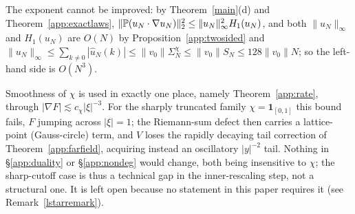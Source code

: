 \begin{remark}\label{app:sharpness}
The exponent cannot be improved: by Theorem~\ref{main}(d) and
Theorem~\ref{app:exactlaws},
$\|\mathbb P(u_N\cdot\nabla u_N)\|_2^2\le\|u_N\|_\infty^2H_1(u_N)$, and both
$\|u_N\|_\infty$ and $H_1(u_N)$ are $O(N)$ by
Proposition~\ref{app:twosided} and
$\|u_N\|_\infty\le\sum_{k\neq0}|\hat u_N(k)|\le\|v_0\|\Sigma_N^\chi
\le\|v_0\|S_N\le128\|v_0\|N$; so the left-hand side is $O(N^3)$.

Smoothness of $\chi$ is used in exactly one place, namely
Theorem~\ref{app:rate}, through $|\nabla F|\lesssim c_\chi|\xi|^{-3}$.
For the sharply truncated family $\chi=\mathbf 1_{[0,1]}$ this bound
fails, $F$ jumping across $|\xi|=1$; the Riemann-sum defect then carries
a lattice-point (Gauss-circle) term, and $V$ loses the rapidly decaying
tail correction of Theorem~\ref{app:farfield}, acquiring instead an
oscillatory $|y|^{-2}$ tail. Nothing in \S\ref{app:duality} or
\S\ref{app:nondeg} would change, both being insensitive to $\chi$; the
sharp-cutoff case is thus a technical gap in the inner-rescaling step,
not a structural one. It is left open because no statement in this paper
requires it (see Remark~\ref{lstarremark}).
\end{remark}
